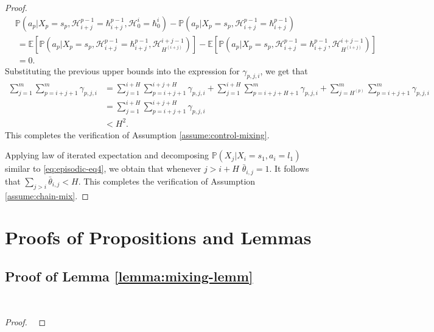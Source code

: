 \documentclass[opre,sglanonrev]{informs4}
\numberwithin{equation}{section}
\newcommand{\pow}[1]{^{(#1)}}
\newcommand{\lp}{\left(}
\newcommand{\rp}{\right)}
\newcommand{\lb}{\left[}
\newcommand{\rb}{\right]}
\newcommand{\History}{\mathcal{H}}
\newcommand{\history}{\hbar}
\newcommand{\Pbb}{\mathbb{P}}
\newcommand{\prob}{\Pbb}
\newcommand{\expec}{\mathbb{E}}
\newcommand{\probl}{\prob}
\begin{document}
\begin{APPENDICES}
\begin{proof}
\begin{align*}
    & \probl\lp a_p|X_p=s_p,\History_{i+j}^{p-1}=\history_{i+j}^{p-1},\History_0^i=\history_{0}^{i}\rp-\probl\lp a_p|X_p=s_p,\History_{i+j}^{p-1}=\history_{i+j}^{p-1}\rp\\
    & \ =\expec\lb \probl\lp a_p|X_p=s_p,\History_{i+j}^{p-1}=\history_{i+j}^{p-1},\History_{H \pow{i+j}}^{i+j-1}\rp\rb-\expec\lb \probl\lp a_p|X_p=s_p,\History_{i+j}^{p-1}=\history_{i+j}^{p-1},\History_{H \pow{i+j}}^{i+j-1}\rp\rb\\
    & \ =0.
\end{align*}
Substituting the previous upper bounds into the expression for $\gamma_{p,j,i}$, we get that
\begin{align*}
    \sum_{j=1}^{m} \sum_{p=i+j+1}^m \gamma_{p,j,i} & =  \sum_{j=1}^{i+H } \sum_{p=i+j+1}^{i+j+H } \gamma_{p,j,i} +\sum_{j=1}^{i+H } \sum_{p=i+j+H +1}^{m} \gamma_{p,j,i}+ \sum_{j={H \pow{p}}}^{m} \sum_{p=i+j+1}^m \gamma_{p,j,i} \\
    & = \sum_{j=1}^{i+H } \sum_{p=i+j+1}^{i+j+H } \gamma_{p,j,i}\\
    & < H ^2.
\end{align*}
This completes the verification of Assumption \ref{assume:control-mixing}.

 Applying law of iterated expectation and decomposing $ \probl\lp X_j|X_i=s_1,a_i=l_1\rp$ similar to \cref{eq:episodic-eq4}, we obtain that whenever $j>i+H $ $\bar \theta_{i,j}=1$. 
It follows that  $\sum_{j>i}\bar\theta_{i,j}<H $. 
This completes the verification of Assumption \ref{assume:chain-mix}.
\end{proof}

\section{Proofs of Propositions and Lemmas}

\subsection{Proof of Lemma \ref{lemma:mixing-lemm}}~\label{sec:prf-mxlemm}

\begin{proof}  \ 


\end{proof}
\end{APPENDICES}
\end{document}
